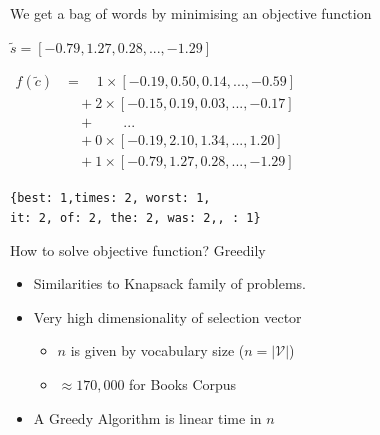 \documentclass[]{beamer}
\renewcommand{\c}{\tilde{c}}
\newcommand{\s}{\tilde{s}}
\newcommand{\V}{\mathcal{V}}
\begin{document}
\begin{frame}{We get a bag of words by minimising an objective function}
	\vectorselectionproblemdefn
	\vfill
	\begin{description}
		\item<2->[Input Vector]  $\s=[−0.79, 1.27, 0.28, ..., −1.29]$
		\vfill
		\item<3->[Vector Selection] $\displaystyle
			\begin{aligned}%
			f(\c)&=\quad1\times[−0.19, 0.50, 0.14, ..., −0.59]\\
			&\quad+2\times[-0.15, 0.19, 0.03, ..., -0.17]\\
			&\quad+\qquad...\\
			&\quad+0\times[−0.19, 2.10, 1.34, ..., 1.20]\\
			&\quad+1\times[−0.79, 1.27, 0.28, ..., −1.29]
		\end{aligned}
		$
		\vfill
		\item<4->[BOW] \texttt{\{best: 1,times: 2, worst: 1, \\it: 2, of: 2, the: 2, was: 2,, : 1\}}
	\end{description}
\end{frame}

\begin{frame}{How to solve objective function? Greedily}
	\vectorselectionproblemdefn
		\vfill
	\begin{itemize}
		\item<1-> Similarities to \alert{Knapsack} family of problems.
		\item<2-> Very high dimensionality of selection vector\begin{itemize}
			\item $n$ is given by vocabulary size ($n=|\V|$)
			\item $\approx170,000$ for Books Corpus
			\end{itemize}
		\item<3-> A Greedy Algorithm is linear time in $n$ 
	\end{itemize}
	\vfill
\end{frame}
\end{document}
